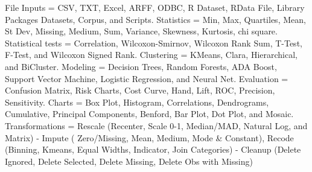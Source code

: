 File Inputs = CSV, TXT, Excel, ARFF, ODBC, R Dataset, RData File, Library Packages Datasets, Corpus, and Scripts.
Statistics = Min, Max, Quartiles, Mean, St Dev, Missing, Medium, Sum, Variance, Skewness, Kurtosis, chi square.
Statistical tests = Correlation, Wilcoxon-Smirnov, Wilcoxon Rank Sum, T-Test, F-Test, and Wilcoxon Signed Rank.
Clustering = KMeans, Clara, Hierarchical, and BiCluster.
Modeling = Decision Trees, Random Forests, ADA Boost, Support Vector Machine, Logistic Regression, and Neural Net.
Evaluation = Confusion Matrix, Risk Charts, Cost Curve, Hand, Lift, ROC, Precision, Sensitivity.
Charts = Box Plot, Histogram, Correlations, Dendrograms, Cumulative, Principal Components, Benford, Bar Plot, Dot Plot, and Mosaic.
Transformations = Rescale (Recenter, Scale 0-1, Median/MAD, Natural Log, and Matrix) - Impute ( Zero/Missing, Mean, Medium, Mode & Constant), Recode (Binning, Kmeans, Equal Widths, Indicator, Join Categories) - Cleanup (Delete Ignored, Delete Selected, Delete Missing, Delete Obs with Missing)
